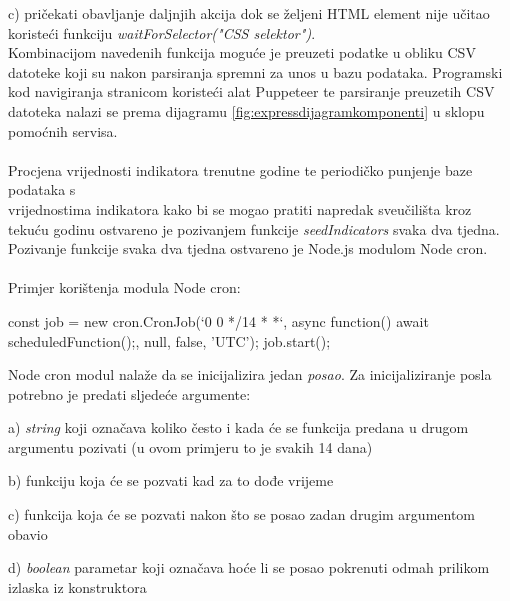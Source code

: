 \documentclass[times, utf8, zavrsni]{fer}
\begin{document}
    c) pričekati obavljanje daljnjih akcija dok se željeni HTML element nije učitao koristeći funkciju \emph{waitForSelector("CSS selektor")}.
\\Kombinacijom navedenih funkcija moguće je preuzeti podatke u obliku CSV datoteke koji su nakon parsiranja spremni za unos u bazu podataka.
Programski kod navigiranja stranicom koristeći alat Puppeteer te parsiranje preuzetih CSV datoteka nalazi se prema 
dijagramu \ref{fig:expressdijagramkomponenti} u sklopu pomoćnih servisa.
\\\\Procjena vrijednosti indikatora trenutne godine te periodičko punjenje baze podataka s \\vrijednostima indikatora kako bi se mogao pratiti napredak 
sveučilišta kroz tekuću godinu ostvareno je pozivanjem funkcije \emph{seedIndicators} svaka dva tjedna. Pozivanje funkcije svaka dva tjedna 
ostvareno je Node.js modulom Node cron. 
\\\\Primjer korištenja modula Node cron:
\begin{verbnobox}[\fontsize{10pt}{10pt}\selectfont] 
    const job = new cron.CronJob(`0 0 */14 * *`, 
                            async function() {
                await scheduledFunction();}, 
                null, false, 'UTC');
    job.start();
\end{verbnobox}  
Node cron modul nalaže da se inicijalizira jedan \emph{posao}. Za inicijaliziranje posla potrebno je predati sljedeće argumente:

    a) \emph{string} koji označava koliko često i kada će se funkcija predana u drugom argumentu pozivati (u ovom primjeru to je svakih 14 dana)

    b) funkciju koja će se pozvati kad za to dođe vrijeme

    c) funkcija koja će se pozvati nakon što se posao zadan drugim argumentom obavio 

    d) \emph{boolean} parametar koji označava hoće li se posao pokrenuti odmah prilikom izlaska iz konstruktora
\end{document}
